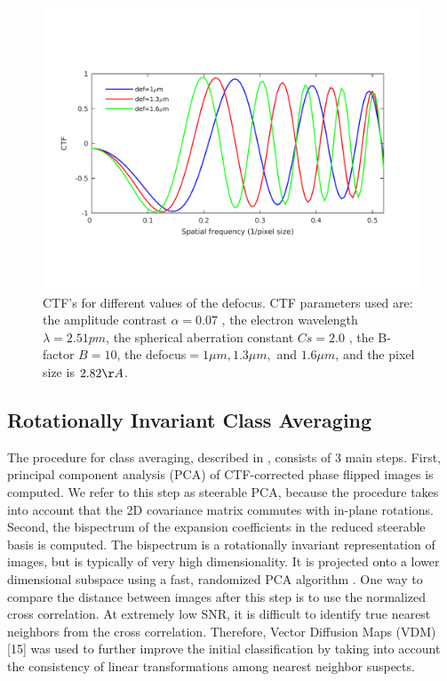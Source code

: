 \documentclass{article}
\begin{document}
\begin{figure}
\begin{center}
\includegraphics[scale=0.35]{ctfeg_fig.png}
\vspace{-.5in}
\caption{CTF's for different values of the defocus. CTF parameters used are: the amplitude contrast $\alpha = 0.07$
, the electron wavelength $\lambda= 2.51pm$, the spherical aberration constant $Cs=2.0$
, the B-factor $B=10$, the defocus$=1\mu m, 1.3\mu m,$ and
$1.6\mu m$, and the pixel size is $2.82\AA$.
}\label{fig:ctf}
\end{center}
\end{figure}

\subsection{Rotationally Invariant Class Averaging}
The procedure for class averaging, described in \cite{zhao}, consists of 3 main steps. First, principal component analysis (PCA) of CTF-corrected phase flipped images is computed. We refer to this step as steerable PCA, because the procedure takes into account that the 2D covariance matrix commutes with in-plane rotations. Second, the bispectrum of the expansion coefficients in the reduced steerable basis is computed. The bispectrum is a rotationally invariant representation of images, but is typically of very high dimensionality. It is projected onto a lower dimensional subspace using a fast, randomized PCA algorithm \cite{rokhlin}. One way to compare the distance between images after this step is to use the normalized cross correlation. At extremely low SNR, it is difficult to identify true nearest neighbors from the cross correlation. Therefore, Vector Diffusion Maps (VDM) [15] was used to further improve the initial classification by taking into account the consistency of linear transformations among nearest neighbor suspects. 
\vspace*{-\baselineskip}
\end{document}
